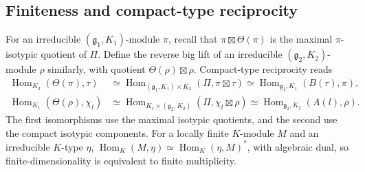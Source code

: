 \documentclass[11pt]{article}
\newcommand{\Hom}{\operatorname{Hom}}
\newcommand{\fg}{\mathfrak g}
\theoremstyle{definition}
\numberwithin{equation}{section}
\begin{document}
\subsection{Finiteness and compact-type reciprocity}
For an irreducible $(\fg_1,K_1)$-module $\pi$, recall that
$\pi\boxtimes\Theta(\pi)$ is the maximal $\pi$-isotypic quotient
of $\Pi$. Define the reverse big lift
of an irreducible $(\fg_2,K_2)$-module $\rho$ similarly, with quotient
$\Theta(\rho)\boxtimes\rho$. Compact-type reciprocity reads
\begin{align}
 \Hom_{K_2}(\Theta(\pi),\tau)
   &\simeq\Hom_{(\fg_1,K_1)\times K_2}(\Pi,\pi\boxtimes\tau)
    \simeq\Hom_{\fg_1,K_1}(B(\tau),\pi),\label{eq:reciprocity1}\\
 \Hom_{K_1}(\Theta(\rho),\chi_l)
   &\simeq\Hom_{K_1\times(\fg_2,K_2)}(\Pi,\chi_l\boxtimes\rho)
    \simeq\Hom_{\fg_2,K_2}(A(l),\rho).\label{eq:reciprocity2}
\end{align}
The first isomorphisms use the maximal isotypic quotients, and the second
use the compact isotypic components.
For a locally finite $K$-module $M$ and an irreducible $K$-type $\eta$,
$\Hom_K(M,\eta)\simeq\Hom_K(\eta,M)^*$, with algebraic dual, so
finite-dimensionality is equivalent to finite multiplicity.
\end{document}
